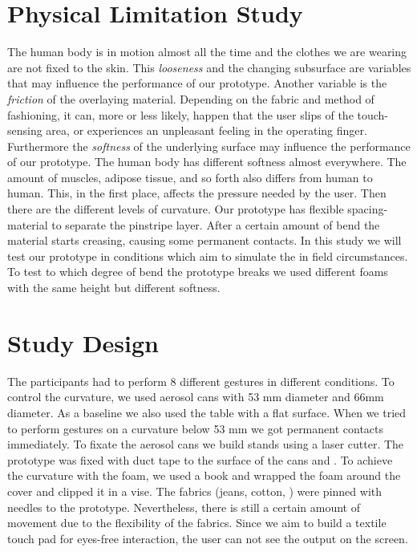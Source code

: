 \section{Physical Limitation Study}
The human body is in motion almost all the time and the clothes we are wearing are not fixed to the skin. This \emph{looseness} and the changing subsurface are variables that may influence the performance of our prototype. Another variable is the \emph{friction} of the overlaying material. Depending on the fabric and method of fashioning, it can, more or less likely, happen that the user slips of the touch-sensing area, or experiences an unpleasant feeling in the operating finger. Furthermore the \emph{softness} of the underlying surface may influence the performance of our prototype. The human body has different softness almost everywhere. The amount of muscles, adipose tissue, and so forth also differs from human to human. This, in the first place, affects the pressure needed by the user. Then there are the different levels of curvature. Our prototype has flexible spacing-material to separate the pinstripe layer. After a certain amount of bend the material starts creasing, causing some permanent contacts. In this study we will test our prototype in conditions which aim to simulate the in field circumstances. To test to which degree of bend the prototype breaks we used different foams with the same height but different softness.

\section{Study Design}
The participants had to perform 8 different gestures in different conditions. To control the curvature, we used aerosol cans with 53 mm diameter and 66mm diameter. As a baseline we also used the table with a flat surface. When we tried to perform gestures on a curvature below 53 mm we got permanent contacts immediately. To fixate the aerosol cans we build stands using a laser cutter. The prototype was fixed with duct tape to the surface of the cans and . To achieve the curvature with the foam, we used a book and wrapped the foam around the cover and clipped it in a vise. The fabrics (jeans, cotton,  ) were pinned with needles to the prototype. Nevertheless, there is still a certain amount of movement due to the flexibility of the fabrics. Since we aim to build a textile touch pad for eyes-free interaction, the user can not see the output on the screen. \\

